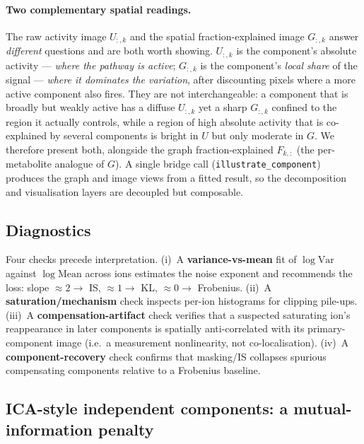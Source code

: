 \documentclass[11pt]{article}
\newcommand{\code}[1]{\texttt{#1}}
\begin{document}
\paragraph{Two complementary spatial readings.} The raw activity image $U_{:,k}$ and the
spatial fraction-explained image $G_{:,k}$ answer \emph{different} questions and are both
worth showing. $U_{:,k}$ is the component's absolute activity --- \emph{where the pathway is
active}; $G_{:,k}$ is the component's \emph{local share} of the signal --- \emph{where it
dominates the variation}, after discounting pixels where a more active component also fires.
They are not interchangeable: a component that is broadly but weakly active has a diffuse
$U_{:,k}$ yet a sharp $G_{:,k}$ confined to the region it actually controls, while a region
of high absolute activity that is co-explained by several components is bright in $U$ but
only moderate in $G$. We therefore present both, alongside the graph fraction-explained
$F_{k,:}$ (the per-metabolite analogue of $G$). A single bridge call
(\code{illustrate\_component}) produces the graph and image views from a fitted result, so
the decomposition and visualisation layers are decoupled but composable.

\subsection{Diagnostics}
\label{sec:diagnostics}

Four checks precede interpretation. (i)~A \textbf{variance-vs-mean} fit of $\log\mathrm{Var}$
against $\log\mathrm{Mean}$ across ions estimates the noise exponent and recommends the loss:
slope $\approx 2 \to$ IS, $\approx 1 \to$ KL, $\approx 0 \to$ Frobenius. (ii)~A
\textbf{saturation/mechanism} check inspects per-ion histograms for clipping pile-ups.
(iii)~A \textbf{compensation-artifact} check verifies that a suspected saturating ion's
reappearance in later components is spatially anti-correlated with its primary-component
image (i.e.\ a measurement nonlinearity, not co-localisation). (iv)~A
\textbf{component-recovery} check confirms that masking/IS collapses spurious compensating
components relative to a Frobenius baseline.

\subsection{ICA-style independent components: a mutual-information penalty}
\label{sec:independence}
\end{document}
